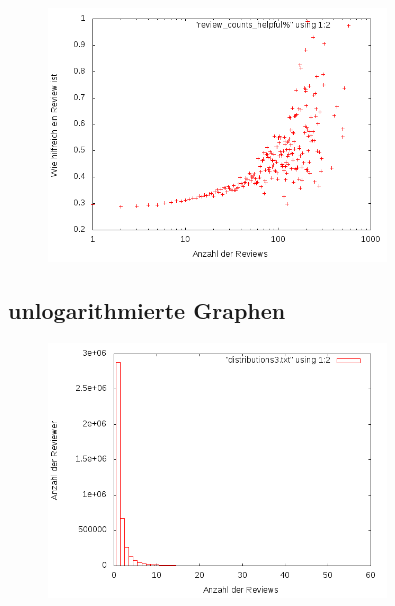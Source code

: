 \documentclass{scrartcl}
\theoremstyle{my_th_style}
\begin{document}
\begin{figure}[H]
   \includegraphics[width=0.8\textwidth]{_results/helpfull_count2.png}
\end{figure}
\subsection*{unlogarithmierte Graphen}

\begin{figure}[H]

   \includegraphics[width=0.8\textwidth]{unlogbox.png}
   \label{unlog}
\end{figure}
\end{document}
